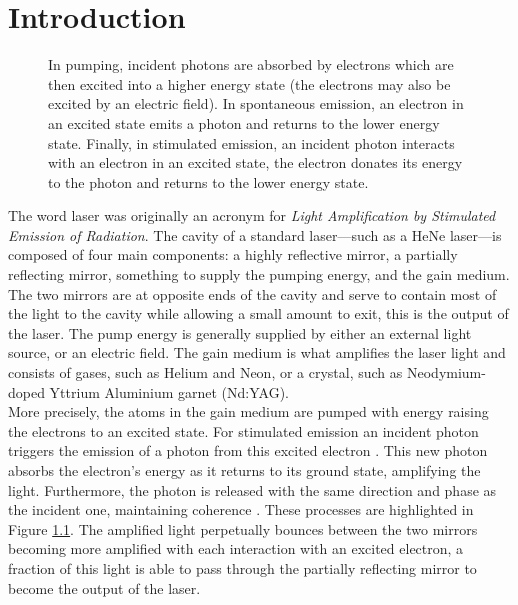 
\chapter{Introduction}
\begin{figure}[tbp]
\centering

\caption[Comparison of pumping, spontaneous emission, and stimulated emission.]{In pumping, incident photons are absorbed by electrons which are then excited into a higher energy state (the electrons may also be excited by an electric field). In spontaneous emission, an electron in an excited state emits a photon and returns to the lower energy state. Finally, in stimulated emission, an incident photon interacts with an electron in an excited state, the electron donates its energy to the photon and returns to the lower energy state.}
\label{fig:emission}
\end{figure}

The word laser was originally an acronym for \emph{Light Amplification by Stimulated Emission of Radiation}. The cavity of a standard laser---such as a HeNe laser---is composed of four main components: a highly reflective mirror, a partially reflecting mirror, something to supply the pumping energy, and the gain medium. The two mirrors are at opposite ends of the cavity and serve to contain most of the light to the cavity while allowing a small amount to exit, this is the output of the laser. The pump energy is generally supplied by either an external light source, or an electric field. The gain medium is what amplifies the laser light and consists of gases, such as Helium and Neon, or a crystal, such as Neodymium-doped Yttrium Aluminium garnet (Nd:YAG). \\

More precisely, the atoms in the gain medium are pumped with energy raising the electrons to an excited state. For stimulated emission an incident photon triggers the emission of a photon from this excited electron \cite{alazzawi}. This new photon absorbs the electron's energy as it returns to its ground state, amplifying the light. Furthermore, the photon is released with the same direction and phase as the incident one, maintaining coherence \cite{alazzawi}. These processes are highlighted in Figure \ref{fig:emission}. The amplified light perpetually bounces between the two mirrors becoming more amplified with each interaction with an excited electron, a fraction of this light is able to pass through the partially reflecting mirror to become the output of the laser. \\

